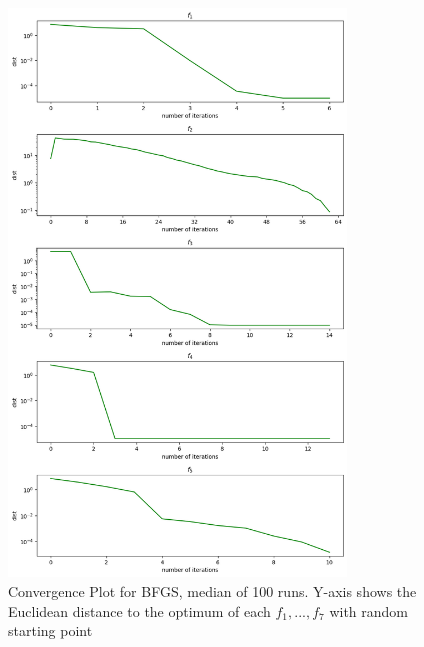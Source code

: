 \documentclass[a4paper]{article}
\begin{document}
\begin{figure}[]
  \centering
  \includegraphics[width=0.8\textwidth]{plt_dists.png}
  \caption{Convergence Plot for BFGS, median of 100 runs. Y-axis shows the
    Euclidean distance to the optimum of each $f_1,...,f_7$ with random starting point}
  \label{plt1}
\end{figure}
\end{document}
